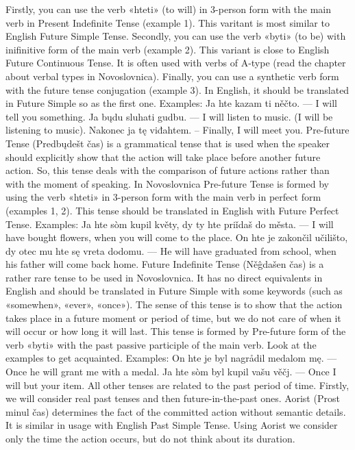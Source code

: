 Firstly, you can use the verb «hteti» (to will) in 3-person form with the main verb in Present Indefinite Tense (example 1). This varitant is most similar to English Future Simple Tense.
Secondly, you can use the verb «byti» (to be) with inifinitive form of the main verb (example 2). This variant is close to English Future Continuous Tense. It is often used with verbs of A-type (read the chapter about verbal types in Novoslovnica).
Finally, you can use a synthetic verb form with the future tense conjugation (example 3). In English, it should be translated in Future Simple so as the first one.
Examples:
Ja hte kazam ti něčto. — I will tell you something.
Ja bųdu sluhati gudbu. — I will listen to music. (I will be listening to music).
Nakonec ja tę viđahtem. – Finally, I will meet you.
Pre-future Tense (Predbųdešt čas) is a grammatical tense that is used when the speaker should explicitly show that the action will take place before another future action. So, this tense deals with the comparison of future actions rather than with the moment of speaking.
In Novoslovnica Pre-future Tense is formed by using the verb «hteti» in 3-person form with the main verb in perfect form (examples 1, 2). This tense should be translated in English with Future Perfect Tense.
Examples:
Ja hte sòm kupil květy, dy ty hte priǐdaš do města. — I will have bought flowers, when you will come to the place.
On hte je zakončil učilišto, dy otec mu hte sę vreta dodomu. — He will have graduated from school, when his father will come back home.
Future Indefinite Tense (Něĝdašen čas) is a rather rare tense to be used in Novoslovnica. It has no direct equivalents in English and should be translated in Future Simple with some keywords (such as «somewhen», «ever», «once»). The sense of this tense is to show that the action takes place in a future moment or period of time, but we do not care of when it will occur or how long it will last.
This tense is formed by Pre-future form of the verb «byti» with the past passive participle of the main verb. Look at the examples to get acquainted.
Examples:
On hte je byl nagrådil medalom mę. — Once he will grant me with a medal.
Ja hte sòm byl kupil vašu věčj. — Once I will but your item.
All other tenses are related to the past period of time. Firstly, we will consider real past tenses and then future-in-the-past ones.
Aorist (Prost minul čas) determines the fact of the committed action without semantic details. It is similar in usage with English Past Simple Tense. Using Aorist we consider only the time the action occurs, but do not think about its duration.
